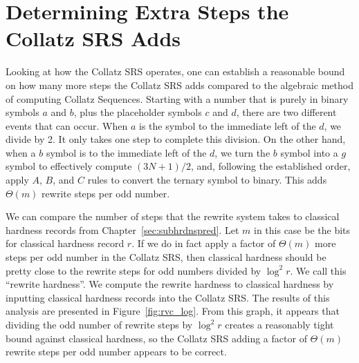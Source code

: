 \section{Determining Extra Steps the Collatz SRS Adds} \label{subsec:estrwsteps}
Looking at how the Collatz SRS operates, one can establish a reasonable bound on how many more steps the Collatz SRS adds compared to the algebraic method of computing Collatz Sequences. Starting with a number that is purely in binary symbols $a$ and $b$, plus the placeholder symbols $c$ and $d$, there are two different events that can occur. When $a$ is the symbol to the immediate left of the $d$, we divide by 2. It only takes one step to complete this division. On the other hand, when a $b$ symbol is to the immediate left of the $d$, we turn the $b$ symbol into a $g$ symbol to effectively compute $(3N+1)/2$, and, following the established order, apply $A$, $B$, and $C$ rules to convert the ternary symbol to binary. This adds $\Theta(m)$ rewrite steps per odd number. \par
We can compare the number of steps that the rewrite system takes to classical hardness records from Chapter~\ref{sec:subhrdnspred}. Let $m$ in this case be the bits for classical hardness record $r$. If we do in fact apply a factor of $\Theta(m)$ more steps per odd number in the Collatz SRS, then classical hardness should be pretty close to the rewrite steps for odd numbers divided by $\log^2{r}$. We call this ``rewrite hardness''. We compute the rewrite hardness to classical hardness by inputting classical hardness records into the Collatz SRS. The results of this analysis are presented in Figure~\ref{fig:rvc_log}. From this graph, it appears that dividing the odd number of rewrite steps by $\log^2{r}$ creates a reasonably tight bound against classical hardness, so the Collatz SRS adding a factor of $\Theta(m)$ rewrite steps per odd number appears to be correct.
